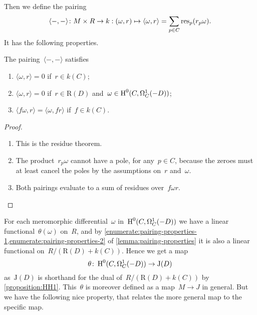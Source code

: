 \documentclass[10pt,a4paper]{article}
\begin{document}
Then we define the pairing
\begin{equation}
  \langle-,-\rangle\colon M\times R\to k:(\omega,r)\mapsto\langle\omega,r\rangle=\sum_{p\in C}\operatorname{res}_p(r_p\omega).
\end{equation}
It has the following properties.
\begin{lemma}
  \label{lemma:pairing-properties}
  The pairing~$\langle-,-\rangle$ satisfies
  \begin{enumerate}
    \item\label{enumerate:pairing-properties-1} $\langle\omega,r\rangle=0$ if~$r\in k(C)$;
    \item\label{enumerate:pairing-properties-2} $\langle\omega,r\rangle=0$ if~$r\in \mathrm{R}(D)$ and~$\omega\in\operatorname{H}^0(C,\Omega_C^1(-D))$;
    \item\label{enumerate:pairing-properties-3} $\langle f\omega,r\rangle=\langle\omega,fr\rangle$ if~$f\in k(C)$.
  \end{enumerate}

  \begin{proof}
    \begin{enumerate}
      \item This is the residue theorem.
      \item The product~$r_p\omega$ cannot have a pole, for any~$p\in C$, because the zeroes must at least cancel the poles by the assumptions on~$r$ and~$\omega$.
      \item Both pairings evaluate to a sum of residues over~$f\omega r$.
    \end{enumerate}
  \end{proof}
\end{lemma}
For each meromorphic differential~$\omega$ in~$\operatorname{H}^0(C,\Omega_C^1(-D))$ we have a linear functional~$\theta(\omega)$ on~$R$, and by \cref{enumerate:pairing-properties-1,enumerate:pairing-properties-2} of \cref{lemma:pairing-properties} it is also a linear functional on~$R/(\mathrm{R}(D)+k(C))$. Hence we get a map
\begin{equation}
  \theta\colon\operatorname{H}^0(C,\Omega_C^1(-D))\to\mathrm{J}(D)
\end{equation}
as~$\mathrm{J}(D)$ is shorthand for the dual of~$R/(\mathrm{R}(D)+k(C))$ by \cref{proposition:HH1}. This~$\theta$ is moreover defined as a map~$M\to J$ in general. But we have the following nice property, that relates the more general map to the specific map.
\end{document}
